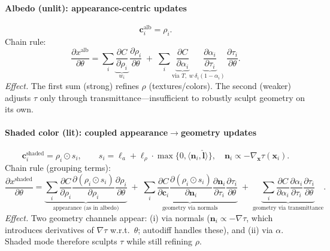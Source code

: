 \begin{enrichment}
\begin{enrichment}
        \paragraph{Albedo (unlit): appearance-centric updates}
        \[
        \mathbf{c}_i^{\text{alb}}=\rho_i.
        \]
        Chain rule:
        \[
        \frac{\partial x^{\text{alb}}}{\partial \theta}
        =\sum_i
        \underbrace{\frac{\partial C}{\partial \rho_i}}_{w_i}\,
        \frac{\partial \rho_i}{\partial \theta}
        \;+\;
        \sum_i
        \underbrace{\frac{\partial C}{\partial \alpha_i}}_{\text{via }T,\;w}\,
        \underbrace{\frac{\partial \alpha_i}{\partial \tau_i}}_{\delta_i(1-\alpha_i)}\,
        \frac{\partial \tau_i}{\partial \theta}.
        \]
        \emph{Effect.} The first sum (strong) refines \(\rho\) (textures/colors). The second (weaker) adjusts \(\tau\) only through transmittance—insufficient to robustly sculpt geometry on its own.
        
        \paragraph{Shaded color (lit): coupled appearance\(\to\)geometry updates}
        \[
        \mathbf{c}_i^{\text{shaded}}=\rho_i\odot s_i,\qquad
        s_i=\boldsymbol{\ell}_a+\boldsymbol{\ell}_\rho\cdot \max\{0,\langle \mathbf{n}_i,\hat{\mathbf{l}}\rangle\},\quad
        \mathbf{n}_i \propto -\nabla_{\mathbf{x}}\tau(\mathbf{x}_i).
        \]
        Chain rule (grouping terms):
        \[
        \frac{\partial x^{\text{shaded}}}{\partial \theta}
        =\underbrace{\sum_i \frac{\partial C}{\partial \rho_i}\frac{\partial (\rho_i\odot s_i)}{\partial \rho_i}\frac{\partial \rho_i}{\partial \theta}}_{\text{appearance (as in albedo)}}
        \;+\;
        \underbrace{\sum_i \frac{\partial C}{\partial \mathbf{c}_i}\frac{\partial (\rho_i\odot s_i)}{\partial \mathbf{n}_i}\frac{\partial \mathbf{n}_i}{\partial \tau_i}\frac{\partial \tau_i}{\partial \theta}}_{\text{geometry via normals}}
        \;+\;
        \underbrace{\sum_i \frac{\partial C}{\partial \alpha_i}\frac{\partial \alpha_i}{\partial \tau_i}\frac{\partial \tau_i}{\partial \theta}}_{\text{geometry via transmittance}}.
        \]
        \emph{Effect.} Two geometry channels appear: (i) via normals (\(\mathbf{n}_i\propto-\nabla\tau\), which introduces derivatives of \(\nabla\tau\) w.r.t.\ \(\theta\); autodiff handles these), and (ii) via \(\alpha\). Shaded mode therefore sculpts \(\tau\) while still refining \(\rho\).
        

\end{enrichment}
\end{enrichment}
